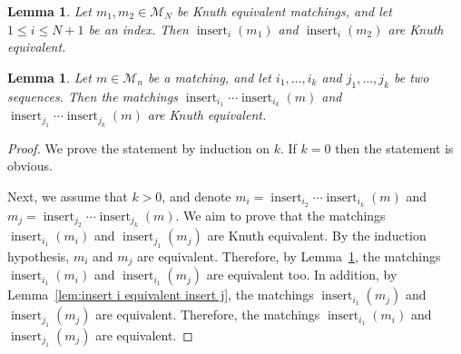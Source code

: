 \documentclass[11pt]{article}
\newtheorem{lemma}[theo]{Lemma}
\theoremstyle{definition}
\numberwithin{equation}{section}
\newcommand{\insrt}{\operatorname{insert}}
\newcommand{\M}{\mathcal{M}}
\begin{document}
\begin{lemma}
\label{lem:insert same chord to equivalent remains equivalent}
    Let $m_1,m_2 \in \M_N$ be Knuth equivalent matchings, and let $1 \le i \le N+1$ be an index. Then $\insrt_i(m_1)$ and $\insrt_i(m_2)$ are Knuth equivalent.
\end{lemma}

\begin{lemma}
\label{lem:insert many chords to matching is equivalent}
    Let $m \in \M_n$ be a matching, and let $i_1,\dots, i_k$ and $j_1,\dots, j_k$ be two sequences. Then the matchings $\insrt_{i_1}\cdots\insrt_{i_k}(m)$ and $\insrt_{j_1}\cdots\insrt_{j_k}(m)$ are Knuth equivalent.
\end{lemma}

\begin{proof}
    We prove the statement by induction on $k$. If $k=0$ then the statement is obvious.

    Next, we assume that $k > 0$, and denote $m_i = \insrt_{i_2}\cdots\insrt_{i_k}(m)$ and $m_j = \insrt_{j_2}\cdots\insrt_{j_k}(m)$. We aim to prove that the matchings $\insrt_{i_1}(m_i)$ and $\insrt_{j_1}(m_j)$ are Knuth equivalent. By the induction hypothesis, $m_i$ and $m_j$ are equivalent. Therefore, by Lemma~\ref{lem:insert same chord to equivalent remains equivalent}, the matchings $\insrt_{i_1}(m_i)$ and $\insrt_{i_1}(m_j)$ are equivalent too. In addition, by Lemma~\ref{lem:insert i equivalent insert j}, the matchings $\insrt_{i_1}(m_j)$ and $\insrt_{j_1}(m_j)$ are equivalent. Therefore, the matchings $\insrt_{i_1}(m_i)$ and $\insrt_{j_1}(m_j)$ are equivalent.
\end{proof}
\end{document}
